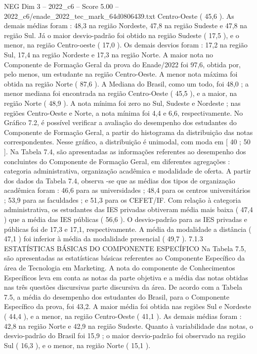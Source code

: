\begin{textsample}{NEG Dim 3 – 2022\_c6 – Score 5.00 – 2022\_c6/enade\_2022\_tec\_mark\_64d0806439.txt}
Centro-Oeste ( 45,6 ).
As demais médias foram : 48,3 na região Nordeste, 47,8 na região Sudeste e 47,8 na região Sul.
Já o maior desvio-padrão foi obtido na região Sudeste ( 17,5 ), e o menor, na região Centro-oeste ( 17,0 ).
Os demais desvios foram : 17,2 na região Sul, 17,4 na região Nordeste e 17,3 na região Norte.
A maior nota no Componente de Formação Geral da prova do Enade/2022 foi 97,6, obtida por, pelo menos, um estudante na região Centro-Oeste.
A menor nota máxima foi obtida na região Norte ( 87,6 ).
A Mediana do Brasil, como um todo, foi 48,0 ; a menor mediana foi encontrada na região Centro-Oeste ( 45,5 ), e a maior, na região Norte ( 48,9 ).
A nota mínima foi zero no Sul, Sudeste e Nordeste ; nas regiões Centro-Oeste e Norte, a nota mínima foi 4,4 e 6,6, respectivamente.
No Gráfico 7.2, é possível verificar a avaliação do desempenho dos estudantes do Componente de Formação Geral, a partir do histograma da distribuição das notas correspondentes.
Nesse gráfico, a distribuição é unimodal, com moda em [ 40 ; 50 ].
Na Tabela 7.4, são apresentadas as informações referentes ao desempenho dos concluintes do Componente de Formação Geral, em diferentes agregações : categoria administrativa, organização acadêmica e modalidade de oferta.
A partir dos dados da Tabela 7.4, observa -se que as médias dos tipos de organização acadêmica foram : 46,6 para as universidades ; 48,4 para os centros universitários ; 53,9 para as faculdades ; e 51,3 para os CEFET/IF.
Com relação à categoria administrativa, os estudantes das IES privadas obtiveram média mais baixa ( 47,4 ) que a média das IES públicas ( 56,6 ).
O desvio-padrão para as IES privadas e públicas foi de 17,3 e 17,1, respectivamente.
A média da modalidade a distância ( 47,1 ) foi inferior à média da modalidade presencial ( 49,7 ). 7.1.3 ESTATÍSTICAS BÁSICAS DO COMPONENTE ESPECÍFICO Na Tabela 7.5, são apresentadas as estatísticas básicas referentes ao Componente Específico da área de Tecnologia em Marketing.
A nota do componente de Conhecimentos Específicos leva em conta as notas da parte objetiva e a média das notas obtidas nas três questões discursivas parte discursiva da área.
De acordo com a Tabela 7.5, a média do desempenho dos estudantes do Brasil, para o Componente Específico da prova, foi 43,2.
A maior média foi obtida nas regiões Sul e Nordeste ( 44,4 ), e a menor, na região Centro-Oeste ( 41,1 ).
As demais médias foram : 42,8 na região Norte e 42,9 na região Sudeste.
Quanto à variabilidade das notas, o desvio-padrão do Brasil foi 15,9 ; o maior desvio-padrão foi observado na região Sul ( 16,3 ), e o menor, na região Norte ( 15,1 ).

\end{textsample}
